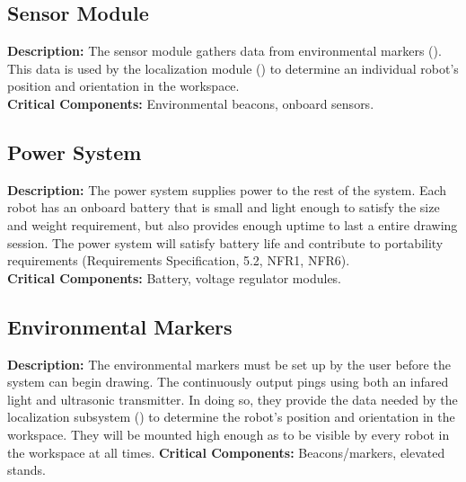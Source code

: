 \subsection{Sensor Module}
\label{sec:subsystem_sensors}
\textbf{Description:} The sensor module gathers data from environmental markers (). This data is used by the localization module () to determine an individual robot's position and orientation in the workspace.\\
\textbf{Critical Components:} Environmental beacons, onboard sensors.\\

\subsection{Power System}
\label{sec:subsystem_power}
\textbf{Description:} The power system supplies power to the rest of the system. Each robot has an onboard battery that is small and light enough to satisfy the size and weight requirement, but also provides enough uptime to last a entire drawing session. The power system will satisfy battery life and contribute to portability requirements (Requirements Specification, 5.2, NFR1, NFR6).\\
\textbf{Critical Components:} Battery, voltage regulator modules.\\

\subsection{Environmental Markers}
\label{sec:subsystem_markers}
\textbf{Description:} The environmental markers must be set up by the user before the system can begin drawing. The continuously output pings using both an infared light and ultrasonic transmitter. In doing so, they provide the data needed by the localization subsystem () to determine the robot's position and orientation in the workspace. They will be mounted high enough as to be visible by every robot in the workspace at all times.
\textbf{Critical Components:} Beacons/markers, elevated stands.